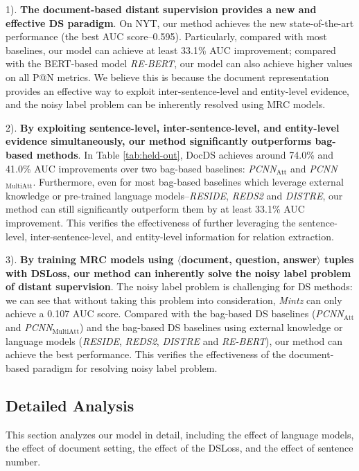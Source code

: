 \documentclass[11pt,a4paper]{article}
\begin{document}
  1). \textbf{The document-based distant supervision provides a new and effective DS paradigm}. On NYT, our method achieves the new state-of-the-art performance (the best AUC score--0.595). Particularly, compared with most baselines,  our model can achieve at least 33.1\% AUC improvement; compared with the BERT-based model \emph{RE-BERT}, our model can also achieve higher values on all P@N metrics. We believe this is because the document representation provides an effective way to exploit inter-sentence-level and entity-level evidence, and the noisy label problem can be inherently resolved using MRC models.
  
  2). \textbf{By exploiting sentence-level, inter-sentence-level, and entity-level evidence simultaneously, our method significantly outperforms bag-based methods}.
  In Table \ref{tab:held-out}, DocDS achieves around 74.0\% and 41.0\% AUC improvements over two bag-based baselines: \emph{PCNN$_\text{Att}$} and \emph{PCNN$_\text{MultiAtt}$}.
  Furthermore, even for most bag-based baselines which leverage external knowledge or pre-trained language models--\emph{RESIDE}, \emph{REDS2} and \emph{DISTRE}, our method can still significantly outperform them by at least 33.1\% AUC improvement.
  This verifies the effectiveness of further leveraging the sentence-level, inter-sentence-level, and entity-level information for relation extraction.
  
  3). \textbf{By training MRC models using $\langle$document, question, answer$\rangle$ tuples with DSLoss, our method can inherently solve the noisy label problem of distant supervision}. 
  The noisy label problem is challenging for DS methods: we can see that without taking this problem into consideration, \emph{Mintz} can only achieve a 0.107 AUC score.
  Compared with the bag-based DS baselines (\emph{PCNN$_\text{Att}$} and \emph{PCNN$_\text{MultiAtt}$}) and the bag-based DS baselines using external knowledge or language models (\emph{RESIDE}, \emph{REDS2}, \emph{DISTRE} and \emph{RE-BERT}), our method can achieve the best performance.
  This verifies the effectiveness of the document-based paradigm for resolving noisy label problem.
  
  \subsection{Detailed Analysis}
  This section analyzes our model in detail, including the effect of language models, the effect of document setting, the effect of the DSLoss, and the effect of sentence number.
  
\end{document}
